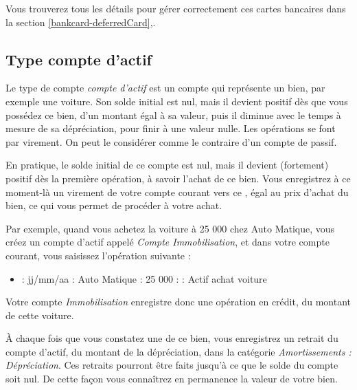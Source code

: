 Vous trouverez tous les détails pour gérer correctement ces cartes bancaires dans la section \vref{bankcard-deferredCard},.


\subsection{Type compte d'actif\label{accounts-type-assets}}

Le type de compte \emph{compte d'actif} est un compte qui représente un bien, par exemple une voiture. Son solde initial est nul, mais il devient positif dès que vous possédez ce bien, d'un montant égal à sa valeur, puis il diminue avec le temps à mesure de sa dépréciation, pour finir à une valeur nulle. Les opérations se font par virement. On peut le considérer comme le  contraire d'un compte de passif.

En pratique, le solde initial de ce compte est nul, mais il devient (fortement) positif dès la première opération, à savoir l'achat de ce bien. Vous enregistrez à ce moment-là un virement de votre compte courant vers ce , égal au prix d'achat du bien, ce qui vous permet de procéder à votre achat.

Par exemple, quand vous achetez la voiture à 25 000 chez Auto Matique, vous créez un compte d'actif appelé \emph{Compte Immobilisation}, et dans votre compte courant, vous saisissez l'opération suivante : 

\begin{itemize}
	\item {} : jj/mm/aa   : Auto Matique   : 25 000   :    : Actif achat voiture
\end{itemize}

Votre compte \emph{Immobilisation} enregistre donc une opération en crédit, du montant de cette voiture.

À chaque fois que vous constatez une  de ce bien, vous enregistrez un retrait du compte d'actif, du montant de la dépréciation, dans la catégorie \emph{Amortissements : Dépréciation}. Ces retraits pourront être faits jusqu'à ce que le solde du compte soit nul. De cette façon vous connaîtrez en permanence la valeur de votre bien.

